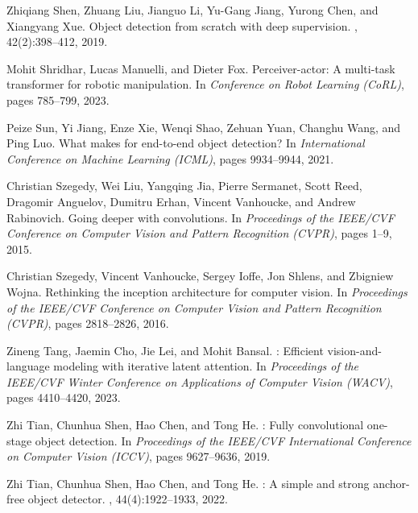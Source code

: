 \documentclass[10pt,twocolumn,letterpaper]{article}
\begin{document}
{\begin{thebibliography}{10}
		Zhiqiang Shen, Zhuang Liu, Jianguo Li, Yu-Gang Jiang, Yurong Chen, and
		Xiangyang Xue.
		\newblock Object detection from scratch with deep supervision.
		, 42(2):398--412, 2019.
		
		Mohit Shridhar, Lucas Manuelli, and Dieter Fox.
		\newblock Perceiver-actor: A multi-task transformer for robotic manipulation.
		\newblock In {\em Conference on Robot Learning (CoRL)}, pages 785--799, 2023.
		
		Peize Sun, Yi Jiang, Enze Xie, Wenqi Shao, Zehuan Yuan, Changhu Wang, and Ping
		Luo.
		\newblock What makes for end-to-end object detection?
		\newblock In {\em International Conference on Machine Learning (ICML)}, pages
		9934--9944, 2021.
		
		Christian Szegedy, Wei Liu, Yangqing Jia, Pierre Sermanet, Scott Reed, Dragomir
		Anguelov, Dumitru Erhan, Vincent Vanhoucke, and Andrew Rabinovich.
		\newblock Going deeper with convolutions.
		\newblock In {\em Proceedings of the IEEE/CVF Conference on Computer Vision and
			Pattern Recognition (CVPR)}, pages 1--9, 2015.
		
		Christian Szegedy, Vincent Vanhoucke, Sergey Ioffe, Jon Shlens, and Zbigniew
		Wojna.
		\newblock Rethinking the inception architecture for computer vision.
		\newblock In {\em Proceedings of the IEEE/CVF Conference on Computer Vision and
			Pattern Recognition (CVPR)}, pages 2818--2826, 2016.
		
		Zineng Tang, Jaemin Cho, Jie Lei, and Mohit Bansal.
		: Efficient vision-and-language modeling with iterative
		latent attention.
		\newblock In {\em Proceedings of the IEEE/CVF Winter Conference on Applications
			of Computer Vision (WACV)}, pages 4410--4420, 2023.
		
		Zhi Tian, Chunhua Shen, Hao Chen, and Tong He.
		: Fully convolutional one-stage object detection.
		\newblock In {\em Proceedings of the IEEE/CVF International Conference on
			Computer Vision (ICCV)}, pages 9627--9636, 2019.
		
		Zhi Tian, Chunhua Shen, Hao Chen, and Tong He.
		: A simple and strong anchor-free object detector.
		, 44(4):1922--1933, 2022.
		

\end{thebibliography}}
\end{document}
